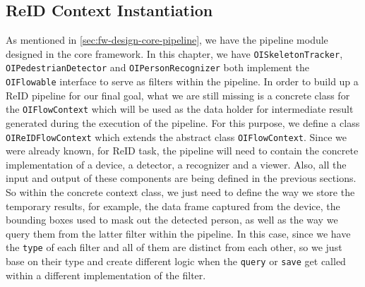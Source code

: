 
%

\subsection{ReID Context Instantiation}
\label{sec:fw-inst-context}

As mentioned in \autoref{sec:fw-design-core-pipeline}, we have the pipeline
module designed in the core framework. In this chapter, we have
\texttt{OISkeletonTracker}, \texttt{OIPedestrianDetector} and
\texttt{OIPersonRecognizer} both implement the \texttt{OIFlowable} interface to
serve as filters within the pipeline. In order to build up a ReID pipeline for
our final goal, what we are still missing is a concrete class for the
\texttt{OIFlowContext} which will be used as the data holder for intermediate
result generated during the execution of the pipeline.
For this purpose, we define a class \texttt{OIReIDFlowContext} which extends
the abstract class \texttt{OIFlowContext}.
Since we were already known, for ReID task, the pipeline will need to contain
the concrete implementation of a device, a detector, a recognizer and a viewer.
Also, all the input and output of these components are
being defined in the previous sections. So within the concrete context class,
we just need to define the way we store the temporary results, for example, the
data frame captured from the device, the bounding boxes used to mask out the
detected person, as well as the way we query them from the latter filter within
the pipeline.
In this case, since we have the \texttt{type} of each filter and all of them
are distinct from each other, so we just base on their type and create
different logic when the \texttt{query} or \texttt{save} get called within
a different implementation of the filter.


